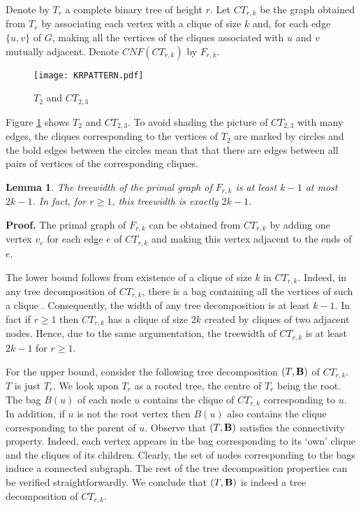 \documentclass{article}
\newtheorem{lemma}{Lemma}
\begin{document}
\begin{comment}
Next, we define a notion of \emph{clique} graph.
Let $H$ be a graph. Then a graph denoted by $CG(H,k)$
is defined as follows. Associate each vertex of $H$ with a clique
of size $k$. For each edge $\{u,v\}$ of $G$ make all the vertices
of the cliques associated with $u$ and $v$ mutually adjacent.
\end{comment}

Denote by $T_r$ a complete binary tree of height $r$.
Let $CT_{r,k}$ be the graph obtained from $T_r$ by associating each vertex
with a clique of size $k$ and, for each edge $\{u,v\}$ of $G$, making all the vertices
of the cliques associated with $u$ and $v$ mutually adjacent.
Denote $CNF(CT_{r,k})$ by $F_{r,k}$. 

\begin{figure}[h]
\centering
\texttt{[image: KRPATTERN.pdf]}
\caption{$T_2$ and $CT_{2,3}$}
\label{TWPattern}
\end{figure}

Figure \ref{TWPattern} shows $T_2$ and $CT_{2,3}$.
To avoid shading the picture of $CT_{2,3}$ with many edges,
the cliques corresponding to the vertices of $T_2$ are marked
by circles and the bold edges between the circles mean that
that there are edges between all pairs of vertices of the corresponding 
cliques. 

\begin{lemma} \label{twf}
The treewidth of the primal graph of $F_{r,k}$ is at least $k-1$ at most $2k-1$. 
In fact, for $r \geq 1$, this treewidth is exactly $2k-1$. 
\end{lemma}

{\bf Proof.}
The primal graph of $F_{r,k}$ can be obtained from $CT_{r,k}$
by adding one vertex $v_e$ for each edge $e$ of $CT_{r,k}$ and
making this vertex adjacent to the ends of $e$.

The lower bound follows from existence of a clique of size $k$ in $CT_{r,k}$.
Indeed, in any tree decomposition of $CT_{r,k}$, there is a bag containing
all the vertices of such a clique \cite{BodlaenderM93}. Consequently, the
width of any tree decomposition is at least $k-1$. In fact if $r \geq 1$
then $CT_{r,k}$ has a clique of size $2k$ created by cliques of two adjacent
nodes. Hence, due to the same argumentation, the treewidth of $CT_{r,k}$
is at least $2k-1$ for $r \geq 1$. 

For the upper bound,
consider the following tree decomposition $(T,{\bf B})$ of $CT_{r,k}$.
$T$ is just $T_r$. We look upon $T_r$ as a rooted tree, the centre of
$T_r$ being the root. The bag $B(u)$ of each node $u$ contains the clique of
$CT_{r,k}$ corresponding to $u$. In addition, if $u$ is not the root vertex
then $B(u)$ also contains the clique corresponding to the parent of $u$. 
Observe that $(T,{\bf B})$ satisfies the connectivity property.
Indeed, each vertex appears in the bag corresponding to its `own' clique and 
the cliques of its children. Clearly, the set of nodes corresponding to the bags 
induce a connected subgraph. The rest of the tree decomposition properties can
be verified straightforwardly. We conclude that $(T,{\bf B})$ is indeed a tree
decomposition of $CT_{r,k}$.
\end{document}
